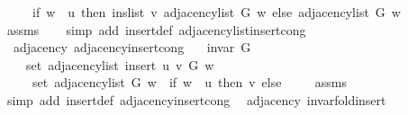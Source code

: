 \begin{isabellebody}
\ \ \ \ \ {\isacharparenleft}{\kern0pt}if\ w\ {\isacharequal}{\kern0pt}\ u\ then\ ins{\isacharunderscore}{\kern0pt}list\ v\ {\isacharparenleft}{\kern0pt}adjacency{\isacharunderscore}{\kern0pt}list\ G\ w{\isacharparenright}{\kern0pt}\ else\ adjacency{\isacharunderscore}{\kern0pt}list\ G\ w{\isacharparenright}{\kern0pt}{\isachardoublequoteclose}\isanewline
%
\isadelimproof
\ \ %
\endisadelimproof
%
\isatagproof
{}\isamarkupfalse%
\ assms\isanewline
\ \ \isamarkupfalse%
\ {\isacharparenleft}{\kern0pt}simp\ add{\isacharcolon}{\kern0pt}\ insert{\isacharprime}{\kern0pt}{\isacharunderscore}{\kern0pt}def\ adjacency{\isacharunderscore}{\kern0pt}list{\isacharunderscore}{\kern0pt}insert{\isacharunderscore}{\kern0pt}cong{\isacharparenright}{\kern0pt}%
\endisatagproof
{\isafoldproof}%
%
\isadelimproof
\isanewline
%
\endisadelimproof
\isanewline
{}\isamarkupfalse%
\ {\isacharparenleft}{\kern0pt}\ adjacency{\isacharparenright}{\kern0pt}\ adjacency{\isacharunderscore}{\kern0pt}insert{\isacharprime}{\kern0pt}{\isacharunderscore}{\kern0pt}cong{\isacharcolon}{\kern0pt}\isanewline
\ \ \ {\isachardoublequoteopen}invar\ G{\isachardoublequoteclose}\isanewline
\ \ \isanewline
\ \ \ \ {\isachardoublequoteopen}set\ {\isacharparenleft}{\kern0pt}adjacency{\isacharunderscore}{\kern0pt}list\ {\isacharparenleft}{\kern0pt}insert{\isacharprime}{\kern0pt}\ u\ v\ G{\isacharparenright}{\kern0pt}\ w{\isacharparenright}{\kern0pt}\ {\isacharequal}{\kern0pt}\isanewline
\ \ \ \ \ set\ {\isacharparenleft}{\kern0pt}adjacency{\isacharunderscore}{\kern0pt}list\ G\ w{\isacharparenright}{\kern0pt}\ {\isasymunion}\ {\isacharparenleft}{\kern0pt}if\ w\ {\isacharequal}{\kern0pt}\ u\ then\ {\isacharbraceleft}{\kern0pt}v{\isacharbraceright}{\kern0pt}\ else\ {\isacharbraceleft}{\kern0pt}{\isacharbraceright}{\kern0pt}{\isacharparenright}{\kern0pt}{\isachardoublequoteclose}\isanewline
%
\isadelimproof
\ \ %
\endisadelimproof
%
\isatagproof
{}\isamarkupfalse%
\ assms\isanewline
\ \ \isamarkupfalse%
\ {\isacharparenleft}{\kern0pt}simp\ add{\isacharcolon}{\kern0pt}\ insert{\isacharprime}{\kern0pt}{\isacharunderscore}{\kern0pt}def\ adjacency{\isacharunderscore}{\kern0pt}insert{\isacharunderscore}{\kern0pt}cong{\isacharparenright}{\kern0pt}%
\endisatagproof
{\isafoldproof}%
%
\isadelimproof
\isanewline
%
\endisadelimproof
\isanewline
{}\isamarkupfalse%
\ {\isacharparenleft}{\kern0pt}\ adjacency{\isacharparenright}{\kern0pt}\ invar{\isacharunderscore}{\kern0pt}fold{\isacharunderscore}{\kern0pt}insert{\isacharprime}{\kern0pt}{\isacharcolon}{\kern0pt}\isanewline

\end{isabellebody}
